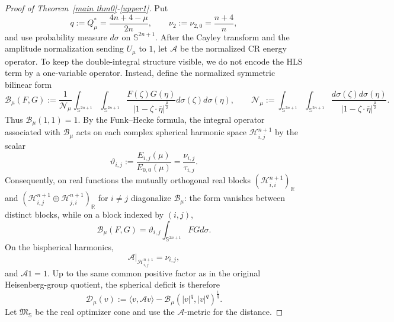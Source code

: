 \documentclass[11pt]{article}
\begin{document}
\begin{proof}[Proof of Theorem~\ref{main thm0}-\eqref{upper1}]
Put
\[
q:=Q^{\ast}_{\mu}=\frac{4n+4-\mu}{2n},\qquad
\nu_2:=\nu_{2,0}=\frac{n+4}{n},
\]
and use probability measure $d\sigma$ on $\mathbb S^{2n+1}$. After the Cayley transform and the amplitude normalization sending $U_\mu$ to $1$, let $\mathscr A$ be the normalized CR energy operator. {To keep the double-integral structure visible, we do not encode the HLS term by a one-variable operator. Instead, define the normalized symmetric bilinear form
\begin{equation*}
 \mathcal B_\mu(F,G):=\frac{1}{\mathcal N_\mu}
 \int_{\mathbb S^{2n+1}}\int_{\mathbb S^{2n+1}}
 \frac{F(\zeta)G(\eta)}{|1-\zeta\cdot\overline\eta|^{\frac{\mu}{2}}}d\sigma(\zeta)d\sigma(\eta),
 \qquad
 \mathcal N_\mu:=\int_{\mathbb S^{2n+1}}\int_{\mathbb S^{2n+1}}
 \frac{d\sigma(\zeta)d\sigma(\eta)}{|1-\zeta\cdot\overline\eta|^{\frac{\mu}{2}}}.
\end{equation*}
Thus $\mathcal B_\mu(1,1)=1$. By the Funk--Hecke formula, the integral operator associated with $\mathcal B_\mu$ acts on each complex spherical harmonic space $\mathcal H_{i,j}^{n+1}$ by the scalar
\begin{equation*}
 \vartheta_{i,j}:=\frac{E_{i,j}(\mu)}{E_{0,0}(\mu)}=\frac{\nu_{i,j}}{\tau_{i,j}}.
\end{equation*}
Consequently, on real functions the mutually orthogonal real blocks {$(\mathcal H_{i,i}^{n+1})_{\mathbb R}$} and $(\mathcal H_{i,j}^{n+1}\oplus\mathcal H_{j,i}^{n+1})_{\mathbb R}$ for $i\ne j$ diagonalize $\mathcal B_\mu$: the form vanishes between distinct blocks, while on a block indexed by $(i,j)$,
\begin{equation*}
 \mathcal B_\mu(F,G)=\vartheta_{i,j}\int_{\mathbb S^{2n+1}}FGd\sigma.
\end{equation*}}
On the bispherical harmonics,
\begin{equation*}
 \mathscr A|_{\mathcal H_{i,j}^{n+1}}=\nu_{i,j},
\end{equation*}
and $\mathscr A1=1$. {Up to the same common positive factor as in the original Heisenberg-group quotient, the spherical deficit is therefore
\begin{equation*}
 \mathscr D_\mu(v):=\langle v,\mathscr Av\rangle-
 \mathcal B_\mu(|v|^q,|v|^q)^{\frac{1}{q}}.
\end{equation*}}
Let $\mathfrak M_{\mathbb S}$ be the real optimizer cone and use the $\mathscr A$-metric for the distance.


\end{proof}
\end{document}
